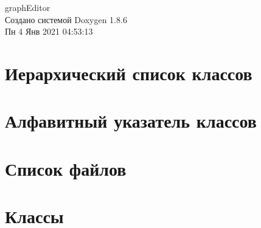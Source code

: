 \documentclass[twoside]{book}
\newcommand{\clearemptydoublepage}{%
  \newpage{\pagestyle{empty}\cleardoublepage}%
}
\begin{document}
\hypersetup{pageanchor=false}
\begin{titlepage}
\vspace*{7cm}
\begin{center}%
{\Large graph\-Editor }\\
\vspace*{1cm}
{\large Создано системой Doxygen 1.8.6}\\
\vspace*{0.5cm}
{\small Пн 4 Янв 2021 04:53:13}\\
\end{center}
\end{titlepage}
\clearemptydoublepage
\tableofcontents
\clearemptydoublepage
{}
\hypersetup{pageanchor=true}

\chapter{Иерархический список классов}

\chapter{Алфавитный указатель классов}

\chapter{Список файлов}

\chapter{Классы}



































\end{document}
